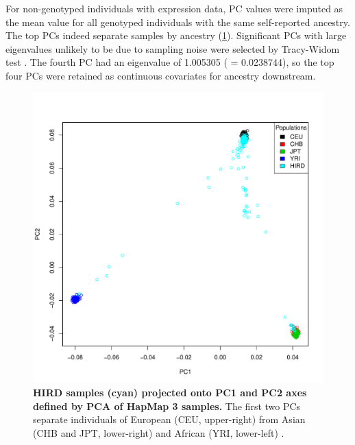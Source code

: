 For non-genotyped individuals with expression data, 
\gls{PC} values were imputed as the mean value for all genotyped individuals with the same self-reported ancestry.
The top \glspl{PC} indeed separate samples by ancestry (\cref{fig:hird_genotype_pca_withHapmap}).
Significant \glspl{PC} with large eigenvalues unlikely to be due to sampling noise were selected by Tracy-Widom test \autocite{patterson2006PopulationStructureEigenanalysis}.
The fourth \gls{PC} had an eigenvalue of \num{1.005305} (\pvalue{} = \num{0.0238744}), 
so the top four \glspl{PC} were retained as continuous covariates for ancestry downstream.

\begin{figure}
    \includegraphics[width=1.0\textwidth]{mainmatter/figures/chapter_02/coreex_eQTLflu_20171204.gencall.smajor.impute_sex.qc3.pruned.hapmap_merged.flipped.pca.evec.pdf}
    \caption{
        \textbf{\gls{HIRD} samples (cyan) projected onto \gls{PC}1 and \gls{PC}2 axes defined by \gls{PCA} of HapMap 3 samples.}
        The first two \glspl{PC} separate individuals of European (CEU, upper-right) from Asian (CHB and JPT, lower-right) and African (YRI, lower-left) .
    }
    \label{fig:hird_genotype_pca_withHapmap}
\end{figure}

